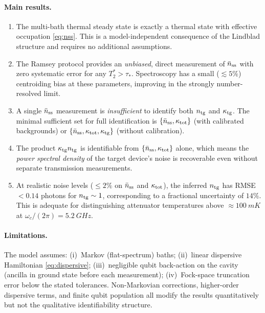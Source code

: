 \documentclass[11pt,a4paper]{article}
\newcommand{\nbar}{\bar{n}}
\newcommand{\kappat}{\kappa_{\rm tot}}
\newcommand{\kappatg}{\kappa_{\rm tg}}
\newcommand{\ntg}{n_{\rm tg}}
\newcommand{\nss}{\nbar_{\rm ss}}
\begin{document}
\paragraph{Main results.}
\begin{enumerate}
  \item The multi-bath thermal steady state is exactly a thermal state
        with effective occupation \cref{eq:nss}.  This is a model-independent
        consequence of the Lindblad structure and requires no additional assumptions.
  \item The Ramsey protocol provides an \emph{unbiased}, direct measurement of
        $\nss$ with zero systematic error for any $T_2^* > \tau_*$.
        Spectroscopy has a small ($\lesssim 5\%$) centroiding bias at these
        parameters, improving in the strongly number-resolved limit.
  \item A single $\nss$ measurement is \emph{insufficient} to identify both
        $\ntg$ and $\kappatg$.  The minimal sufficient set for full identification
        is $\{\nss, \kappat\}$ (with calibrated backgrounds) or
        $\{\nss, \kappat, \kappatg\}$ (without calibration).
  \item The product $\kappatg\ntg$ is identifiable from $\{\nss, \kappat\}$
        alone, which means the \emph{power spectral density} of the target
        device's noise is recoverable even without separate transmission measurements.
  \item At realistic noise levels ($\le 2\%$ on $\nss$ and $\kappat$), the
        inferred $\ntg$ has RMSE $< 0.14$ photons for $\ntg \sim 1$, corresponding
        to a fractional uncertainty of $14\%$.  This is adequate for distinguishing
        attenuator temperatures above $\approx \SI{100}{mK}$ at $\omega_c/(2\pi) = \SI{5.2}{GHz}$.
\end{enumerate}

\paragraph{Limitations.}
The model assumes:
(i)~Markov (flat-spectrum) baths; (ii)~linear dispersive Hamiltonian \cref{eq:dispersive};
(iii)~negligible qubit back-action on the cavity (ancilla in ground state before each measurement);
(iv)~Fock-space truncation error below the stated tolerances.
Non-Markovian corrections, higher-order dispersive terms, and finite qubit
population all modify the results quantitatively but not the qualitative
identifiability structure.
\end{document}
